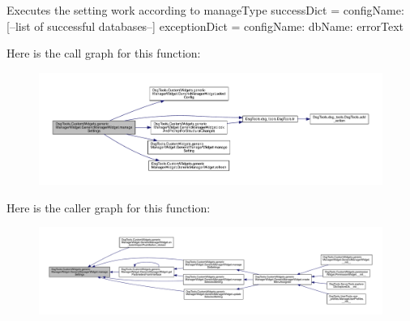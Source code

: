 \begin{DoxyVerb}Executes the setting work according to manageType
successDict = {configName: [--list of successful databases--]}
exceptionDict = {configName: {dbName: errorText}}
\end{DoxyVerb}
 Here is the call graph for this function\+:
\nopagebreak
\begin{figure}[H]
\begin{center}
\leavevmode
\includegraphics[width=350pt]{class_dsg_tools_1_1_custom_widgets_1_1generic_manager_widget_1_1_generic_manager_widget_af4b8531bd14c17c9089f310addfa2c4b_cgraph}
\end{center}
\end{figure}
Here is the caller graph for this function\+:
\nopagebreak
\begin{figure}[H]
\begin{center}
\leavevmode
\includegraphics[width=350pt]{class_dsg_tools_1_1_custom_widgets_1_1generic_manager_widget_1_1_generic_manager_widget_af4b8531bd14c17c9089f310addfa2c4b_icgraph}
\end{center}
\end{figure}
\mbox{\label{class_dsg_tools_1_1_custom_widgets_1_1generic_manager_widget_1_1_generic_manager_widget_a984787082b2593cfda93ba51b5c9c4f0}} 
